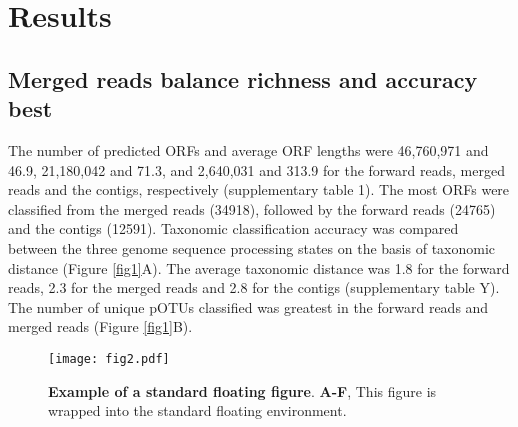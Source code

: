 \documentclass[10pt,letterpaper]{article}
\begin{document}
\section*{Results}
\subsection*{Merged reads balance richness and accuracy best}
The number of predicted ORFs and average ORF lengths were 46,760,971 and 46.9, 21,180,042 and 71.3, and 2,640,031 and 313.9 for the forward reads, merged reads and the contigs, respectively (supplementary table 1). The most ORFs were classified from the merged reads (34918), followed by the forward reads (24765) and the contigs (12591). Taxonomic classification accuracy was compared between the three genome sequence processing states on the basis of taxonomic distance (Figure \ref{fig1}A). The average taxonomic distance was 1.8 for the forward reads, 2.3 for the merged reads and 2.8 for the contigs (supplementary table Y). The number of unique pOTUs classified was greatest in the forward reads and merged reads (Figure \ref{fig1}B). 


\begin{figure}[ht] %


\texttt{[image: fig2.pdf]}

\caption{\color{Gray} \textbf{Example of a standard floating figure}. \textbf{A-F}, This figure is wrapped into the standard floating environment.}

\label{fig2} %

\end{figure}
\end{document}

